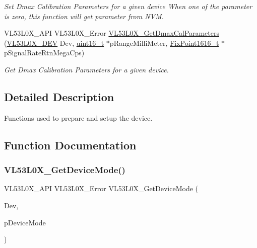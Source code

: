 \begin{DoxyCompactItemize}
\begin{DoxyCompactList}\small\item\em Set Dmax Calibration Parameters for a given device When one of the parameter is zero, this function will get parameter from N\+VM. \end{DoxyCompactList}\item 
V\+L53\+L0\+X\+\_\+\+A\+PI V\+L53\+L0\+X\+\_\+\+Error \hyperlink{group__VL53L0X__parameters__group_ga8e3f50afe785be486061bc30eb86129e}{V\+L53\+L0\+X\+\_\+\+Get\+Dmax\+Cal\+Parameters} (\hyperlink{group__VL53L0X__platform__group_ga2d6405308b1dd524b462f1b8fb97d167}{V\+L53\+L0\+X\+\_\+\+D\+EV} Dev, \hyperlink{vl53l0x__types_8h_a273cf69d639a59973b6019625df33e30}{uint16\+\_\+t} $\ast$p\+Range\+Milli\+Meter, \hyperlink{vl53l0x__types_8h_afb910790161809fc76e1a274a6349384}{Fix\+Point1616\+\_\+t} $\ast$p\+Signal\+Rate\+Rtn\+Mega\+Cps)
\begin{DoxyCompactList}\small\item\em Get Dmax Calibration Parameters for a given device. \end{DoxyCompactList}\end{DoxyCompactItemize}


\subsection{Detailed Description}
Functions used to prepare and setup the device. 



\subsection{Function Documentation}
\mbox{\label{group__VL53L0X__parameters__group_ga228a691a1d324522523f4e7ff6f8c9bd}} 
\subsubsection{\texorpdfstring{V\+L53\+L0\+X\+\_\+\+Get\+Device\+Mode()}{VL53L0X\_GetDeviceMode()}}
{\footnotesize\ttfamily V\+L53\+L0\+X\+\_\+\+A\+PI V\+L53\+L0\+X\+\_\+\+Error V\+L53\+L0\+X\+\_\+\+Get\+Device\+Mode (\begin{DoxyParamCaption}\item[{\hyperlink{group__VL53L0X__platform__group_ga2d6405308b1dd524b462f1b8fb97d167}{V\+L53\+L0\+X\+\_\+\+D\+EV}}]{Dev,  }\item[{V\+L53\+L0\+X\+\_\+\+Device\+Modes $\ast$}]{p\+Device\+Mode }\end{DoxyParamCaption})}



